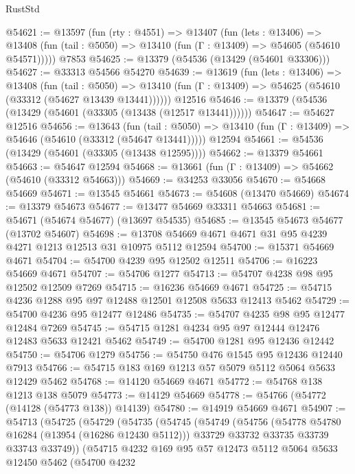 \begin{lexlean}{RustStd}
\begin{coremodule}
@54621 := @13597
    (fun (rty : @4551) =>
    @13407
      (fun (lets : @13406) =>
      @13408 (fun (tail : @5050) => @13410 (fun (Γ : @13409) => @54605 (@54610 @54571)))))
    @7853
@54625 := @13379 (@54536 (@13429 (@54601 @33306)))
@54627 := @33313 @54566 @54270
@54639 := @13619
    (fun (lets : @13406) =>
    @13408
      (fun (tail : @5050) =>
      @13410 (fun (Γ : @13409) => @54625 (@54610 (@33312 (@54627 @13439 @13441))))))
    @12516
@54646 := @13379 (@54536 (@13429 (@54601 (@33305 (@13438 (@12517 @13441))))))
@54647 := @54627 @12516
@54656 := @13643
    (fun (tail : @5050) => @13410 (fun (Γ : @13409) => @54646 (@54610 (@33312 (@54647 @13441)))))
    @12594
@54661 := @54536 (@13429 (@54601 (@33305 (@13438 @12595))))
@54662 := @13379 @54661
@54663 := @54647 @12594
@54668 := @13661 (fun (Γ : @13409) => @54662 (@54610 (@33312 @54663)))
@54669 := @34253 @33056
@54670 := @54668 @54669
@54671 := @13545 @54661
@54673 := @54608 (@13470 @54669)
@54674 := @13379 @54673
@54677 := @13477 @54669 @33311 @54663
@54681 := @54671 (@54674 @54677) (@13697 @54535)
@54685 := @13545 @54673 @54677 (@13702 @54607)
@54698 := @13708 @54669 @4671 @4671 @31 @95 @4239 @4271 @1213 @12513 @31 @10975 @5112 @12594
@54700 := @15371 @54669 @4671
@54704 := @54700 @4239 @95 @12502 @12511
@54706 := @16223 @54669 @4671
@54707 := @54706 @1277
@54713 := @54707 @4238 @98 @95 @12502 @12509 @7269
@54715 := @16236 @54669 @4671
@54725 := @54715 @4236 @1288 @95 @97 @12488 @12501 @12508 @5633 @12413 @5462
@54729 := @54700 @4236 @95 @12477 @12486
@54735 := @54707 @4235 @98 @95 @12477 @12484 @7269
@54745 := @54715 @1281 @4234 @95 @97 @12444 @12476 @12483 @5633 @12421 @5462
@54749 := @54700 @1281 @95 @12436 @12442
@54750 := @54706 @1279
@54756 := @54750 @476 @1545 @95 @12436 @12440 @7913
@54766 := @54715 @183 @169 @1213 @57 @5079 @5112 @5064 @5633 @12429 @5462
@54768 := @14120 @54669 @4671
@54772 := @54768 @138 @1213 @138 @5079
@54773 := @14129 @54669
@54778 := @54766 (@54772 (@14128 (@54773 @138)) @14139)
@54780 := @14919 @54669 @4671
@54907 := @54713
    (@54725
      (@54729
        (@54735
          (@54745
            (@54749
              (@54756
                (@54778 @54780 @16284 (@13954 (@16286 @12430 @5112)))
                @33729
                @33732
                @33735
                @33739
                @33743
                @33749))
            (@54715
              @4232
              @169
              @95
              @57
              @12473
              @5112
              @5064
              @5633
              @12450
              @5462
              (@54700
                @4232

\end{coremodule}
\end{lexlean}
